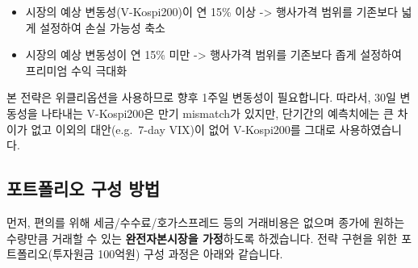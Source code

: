 \documentclass[
  a4paper,
  DIV=11,
  numbers=noendperiod]{scrreprt}
\providecommand{\tightlist}{%
  \setlength{\itemsep}{0pt}\setlength{\parskip}{0pt}}\usepackage{longtable,booktabs,array}
\begin{document}
\begin{itemize}
\tightlist
\item
  시장의 예상 변동성(V-Kospi200)이 연 15\% 이상 -\textgreater{} 행사가격
  범위를 기존보다 넓게 설정하여 손실 가능성 축소
\item
  시장의 예상 변동성이 연 15\% 미만 -\textgreater{} 행사가격 범위를
  기존보다 좁게 설정하여 프리미엄 수익 극대화
\end{itemize}

\begin{tcolorbox}[enhanced jigsaw, breakable, colframe=quarto-callout-color-frame, bottomrule=.15mm, arc=.35mm, opacityback=0, leftrule=.75mm, left=2mm, toprule=.15mm, rightrule=.15mm, colback=white]

본 전략은 위클리옵션을 사용하므로 향후 1주일 변동성이 필요합니다.
따라서, 30일 변동성을 나타내는 V-Kospi200은 만기 mismatch가 있지만,
단기간의 예측치에는 큰 차이가 없고 이외의 대안(e.g.~7-day VIX)이 없어
V-Kospi200를 그대로 사용하였습니다.

\end{tcolorbox}

\subsection*{포트폴리오 구성
방법}\label{uxd3ecuxd2b8uxd3f4uxb9acuxc624-uxad6cuxc131-uxbc29uxbc95}

먼저, 편의를 위해 세금/수수료/호가스프레드 등의 거래비용은 없으며 종가에
원하는 수량만큼 거래할 수 있는 \textbf{완전자본시장을 가정}하도록
하겠습니다. 전략 구현을 위한 포트폴리오(투자원금 100억원) 구성 과정은
아래와 같습니다.
\end{document}
